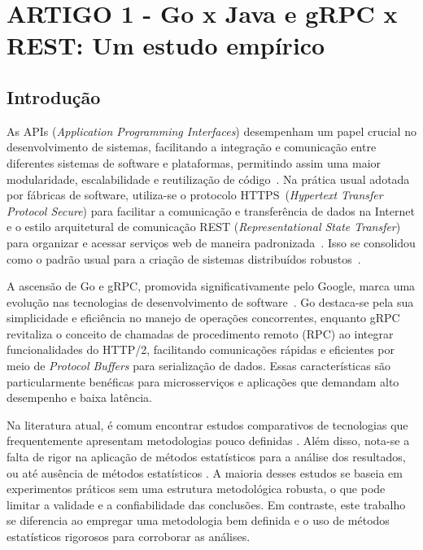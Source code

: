 \chapter{ARTIGO 1 - Go x Java e gRPC x REST: Um estudo empírico}
\label{sec:artigo}

\section{Introdução}
As APIs ({\em Application Programming Interfaces}) desempenham um papel crucial no desenvolvimento de sistemas,
facilitando a integração e comunicação entre diferentes sistemas de software e plataformas, 
permitindo assim uma maior modularidade, escalabilidade e reutilização de código~\cite{apiArchitecture}.
%
Na prática usual adotada por fábricas de software, utiliza-se o protocolo HTTPS~(\textit{Hypertext Transfer Protocol Secure}) para 
facilitar a comunicação e transferência de dados na Internet
e o estilo arquitetural de comunicação REST (\textit{Representational State Transfer}) 
para organizar e acessar serviços web de maneira padronizada~\cite{rfc2616, fielding2000architectural}.
Isso se consolidou como o padrão usual para a criação de sistemas distribuídos robustos~\cite{restPop, apiArchitecture, restRefact}.

A ascensão de Go e gRPC, promovida significativamente pelo Google, marca uma evolução nas tecnologias de desenvolvimento de software~\cite{go2012, grpc2015}. Go destaca-se pela sua simplicidade e eficiência no manejo de operações concorrentes, enquanto gRPC revitaliza o conceito de chamadas de procedimento remoto (RPC) ao integrar funcionalidades do HTTP/2, facilitando comunicações rápidas e eficientes por meio de \textit{Protocol Buffers} para serialização de dados. Essas características são particularmente benéficas para microsserviços e aplicações que demandam alto desempenho e baixa latência.

Na literatura atual, é comum encontrar estudos comparativos de tecnologias que frequentemente apresentam metodologias pouco definidas \cite{javaVsGo, kaminski2023comparative,optimalPythonR}. 
Além disso, nota-se a falta de rigor na aplicação de métodos estatísticos para a análise dos resultados, ou até ausência de métodos estatísticos \cite{restGraphqlGrpc,kaminski2023comparative, berg2023benchmarking}. A maioria desses estudos se baseia em experimentos práticos sem uma estrutura metodológica robusta, o que pode limitar a validade e a confiabilidade das conclusões. Em contraste, este trabalho se diferencia ao empregar uma metodologia bem definida e o uso de métodos estatísticos rigorosos para corroborar as análises.


